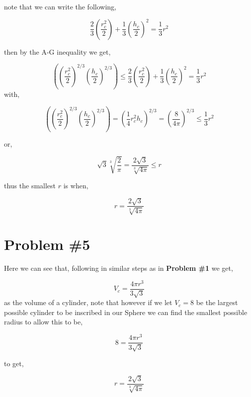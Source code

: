 \documentclass{article}
\begin{document}
note that we can write the following,

\begin{equation*}
    \frac{2}{3}\left(\frac{r_c^2}{2}\right) + \frac{1}{3}\left(\frac{h_c}{2}\right)^2 = \frac{1}{3}r^2 
\end{equation*}

then by the A-G inequality we get,

\begin{equation*}
   \left(\left(\frac{r_c^2}{2}\right)^{2/3} \left(\frac{h_c}{2}\right)^{2/3}\right) \leq \frac{2}{3}\left(\frac{r_c^2}{2}\right) + \frac{1}{3}\left(\frac{h_c}{2}\right)^2 = \frac{1}{3}r^2 
\end{equation*}
with,

\begin{equation*}
    \left(\left(\frac{r_c^2}{2}\right)^{2/3} \left(\frac{h_c}{2}\right)^{2/3}\right) = \left( \frac{1}{4}r_c^2h_c\right)^{2/3} = \left( \frac{8}{4\pi}\right)^{2/3} \leq \frac{1}{3}r^2
\end{equation*}

or,

\begin{equation*}
   \sqrt{3}\sqrt[3]{\frac{2}{\pi}} = \frac{2\sqrt{3}}{\sqrt[3]{4\pi}} \leq r
\end{equation*}

thus the smallest $r$ is when, 

\begin{equation*}
    r = \frac{2\sqrt{3}}{\sqrt[3]{4\pi}}
\end{equation*}

\section*{Problem \#5}
Here we can see that, following in similar steps as in \textbf{Problem \#1} we get,

\begin{equation*}
    V_c = \frac{4\pi r^3}{3\sqrt{3}}
\end{equation*}
as the volume of a cylinder, note that however if we let $V_c = 8$ be the largest possible cylinder to be inscribed in our Sphere we can find the smallest possible radius to allow this to be,

\begin{equation*}
   8 = \frac{4\pi r^3}{3\sqrt{3}}
\end{equation*}

to get,

\begin{equation*}
    r = \frac{2\sqrt{3}}{\sqrt[3]{4\pi}}
\end{equation*}
\end{document}

